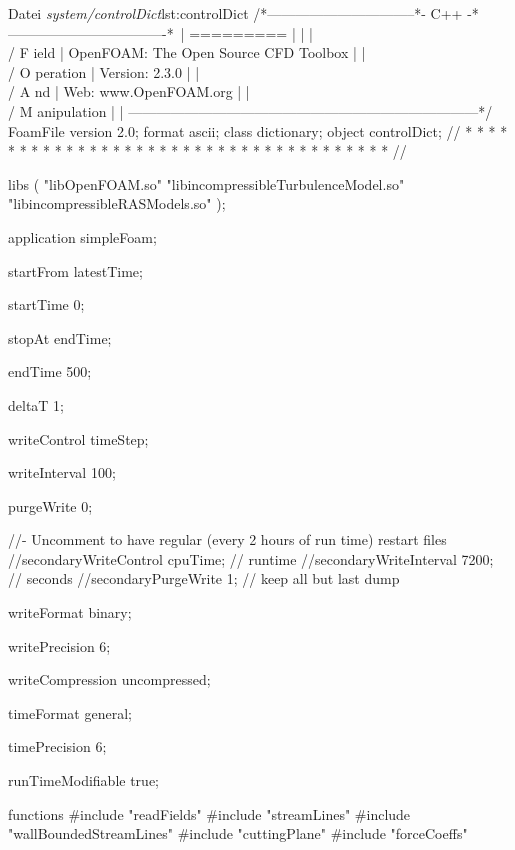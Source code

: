 \newpage

\begin{dict}{Datei \textit{system/controlDict}}{lst:controlDict}
/*--------------------------------*- C++ -*----------------------------------*\
| =========                 |                                                 |
| \\      /  F ield         | OpenFOAM: The Open Source CFD Toolbox           |
|  \\    /   O peration     | Version:  2.3.0                                 |
|   \\  /    A nd           | Web:      www.OpenFOAM.org                      |
|    \\/     M anipulation  |                                                 |
\*---------------------------------------------------------------------------*/
FoamFile
{
    version     2.0;
    format      ascii;
    class       dictionary;
    object      controlDict;
}
// * * * * * * * * * * * * * * * * * * * * * * * * * * * * * * * * * * * * * //

libs
(
    "libOpenFOAM.so"
    "libincompressibleTurbulenceModel.so"
    "libincompressibleRASModels.so"
);

application     simpleFoam;

startFrom       latestTime;

startTime       0;

stopAt          endTime;

endTime         500;

deltaT          1;

writeControl    timeStep;

writeInterval   100;

purgeWrite      0;


//- Uncomment to have regular (every 2 hours of run time) restart files
//secondaryWriteControl    cpuTime; // runtime
//secondaryWriteInterval   7200;    // seconds
//secondaryPurgeWrite      1;       // keep all but last dump


writeFormat     binary;

writePrecision  6;

writeCompression uncompressed;

timeFormat      general;

timePrecision   6;

runTimeModifiable true;

functions
{
    #include "readFields"
    #include "streamLines"
    #include "wallBoundedStreamLines"
    #include "cuttingPlane"
    #include "forceCoeffs"
}
\end{dict}

\newpage